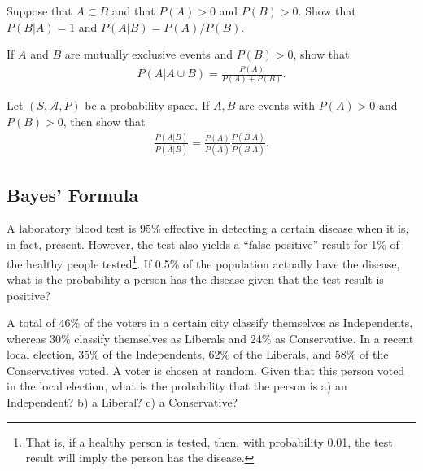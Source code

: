 	\begin{problem}
	Suppose that $A \subset B$ and that $P (A) > 0$ and $P (B) > 0$. Show that $P (B | A) = 1$ and $P (A | B) = P (A) / P (B)$.
	\end{problem}
	
	\begin{problem}
	If $A$ and $B$ are mutually exclusive events and $P (B) > 0$, show that
	\begin{align*}
	P (A | A \cup B) = \frac{P (A)}{P (A) + P (B)} .
	\end{align*}
	\end{problem}
	
	\begin{problem}
	Let $(S, \mathcal{A}, P )$ be a probability space. If $A, B$ are events with $P (A) > 0$ and $P (B) > 0$, then show that
		\begin{align*}
		\frac{P (A|B)}{P (\overline{A} | B)} = \frac{P (A)}{P (\overline{A})} \frac{P (B|A)}{P (B|\overline{A})} .
		\end{align*}
	\end{problem}
	
	\subsection{Bayes' Formula}
	
	\begin{problem}
	A laboratory blood test is 95\% effective in detecting a certain disease when it is, in fact, present. However, the test also yields a ``false positive'' result for 1\% of the healthy people tested\footnote{That is, if a healthy person is tested, then, with probability 0.01, the test result will imply the person has the disease.}. If 0.5\% of the population actually have the disease, what is the probability a person has the disease given that the test result is positive?
	\end{problem}

	\begin{problem}
	A total of 46\% of the voters in a certain city classify themselves as Independents, whereas 30\% classify themselves as Liberals and 24\% as Conservative. In a recent local election, 35\% of the Independents, 62\% of the Liberals, and 58\% of the Conservatives voted. A voter is chosen at random. Given that this person voted in the local election, what is the probability that the person is a) an Independent? b) a Liberal? c) a Conservative?
	\end{problem}
	
